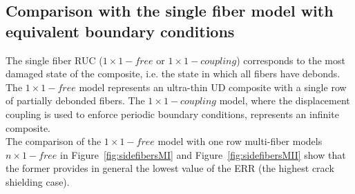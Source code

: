 \documentclass[review]{elsarticle}
\begin{document}
%

\subsection{Comparison with the single fiber model with equivalent boundary conditions}

The single fiber RUC ($1\times 1-free$ or $1\times 1-coupling$) corresponds to the most damaged state of the composite, i.e. the state in which all fibers have debonds. The $1\times 1-free$ model represents an ultra-thin UD composite with a single row of partially debonded fibers. The $1\times 1-coupling$ model, where the displacement coupling is used to enforce periodic boundary conditions, represents an infinite composite.\\
The comparison of the $1\times 1-free$  model with one row multi-fiber models $n\times 1-free$ in Figure~\ref{fig:sidefibersMI} and Figure~\ref{fig:sidefibersMII} show that the former provides in general the lowest value of the ERR (the highest crack shielding case).

%
\end{document}

